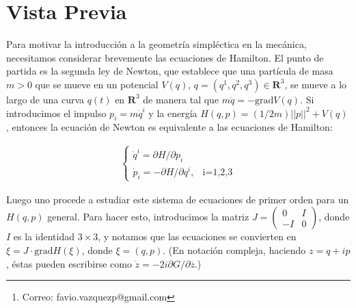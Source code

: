 \documentclass[a4paper,10pt]{article}
\author{Favio Vázquez\thanks{Correo: favio.vazquezp@gmail.com}}\affil{Instituto de Ciencias Nucleares. Universidad Nacional Autónoma de México.}
\date{}
\numberwithin{equation}{section}
\newcommand{\grad}{\text{grad}}
\begin{document}
\makeatletter
\def\@maketitle{%
  \newpage
  \null
  \vskip 2em%
  \begin{center}%
  \let \footnote \thanks
    {\Large\bfseries \@title \par}%
    \vskip 1.5em%
    {\normalsize
      \lineskip .5em%
      \begin{tabular}[t]{c}%
        \@author
      \end{tabular}\par}%
    \vskip 1em%
    {\normalsize \@date}%
  \end{center}%
  \par
  \vskip 1.5em}
\makeatother

\maketitle

\section*{Vista Previa}

Para motivar la introducción a la geometría simpléctica en la mecánica, necesitamos 
considerar brevemente las ecuaciones de Hamilton. El punto de partida es la segunda 
ley de Newton, que establece que una partícula de masa $m > 0$ que se mueve en un 
potencial $V(q)$, $q=(q^1,q^2,q^3) \in \mathbf{R}^3$, se mueve a lo largo de una 
curva $q(t)$ en $\mathbf{R}^3$ de manera tal que $m\ddot{q} = - \grad{V(q)}$. Si 
introducimos el impulso $p_i = m\dot{q}^i$ y la energía $H(q,p) = (1/2m)||p||^2 + V(q)$,
entonces la ecuación de Newton es equivalente a las ecuaciones de Hamilton:

\begin{align*}
 \begin{cases}
  \dot{q}^i = \partial H/\partial p_i \\
  \dot{p}_i = - \partial H/\partial q^i,          & \text{i=1,2,3}
\end{cases}
\end{align*}

Luego uno procede a estudiar este sistema de ecuaciones de primer orden para un $H(q,p)$ 
general. Para hacer esto, introducimos la matriz $J = \begin{pmatrix} 0 & I \\ -I & 0\end{pmatrix}$, 
donde $I$ es la identidad $3\times 3$, y notamos que las ecuaciones se convierten en 
$\dot{\xi} = J\cdot \grad H(\xi)$, donde $\xi = (q,p)$. (En notación compleja, 
haciendo $z=q+ip$, éstas pueden escribirse como $\dot{z} = -2i\partial G/\partial\overline{z}$.)
\end{document}
